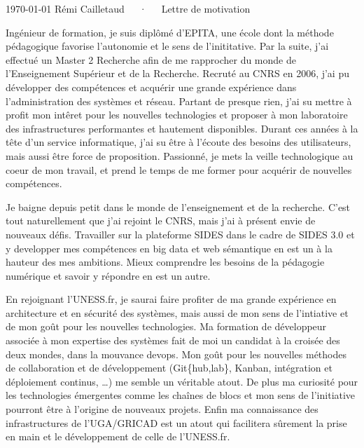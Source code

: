 \documentclass[11pt, a4paper]{awesome-cv}
\begin{document}
\makecvheader[R]

\makecvfooter
  {\today}
  {Rémi Cailletaud~~~·~~~Lettre de motivation}
  {}

\makelettertitle

\begin{cvletter}

	Ingénieur de formation, je suis diplômé d'EPITA, une école dont la méthode pédagogique favorise l'autonomie et le sens de l'inititative. Par la suite, j'ai effectué un Master 2 Recherche afin de me rapprocher du monde de l'Enseignement Supérieur et de la Recherche. Recruté au CNRS en 2006, j'ai pu développer des compétences et acquérir une grande expérience dans l'administration des systèmes et réseau. Partant de presque rien, j'ai su mettre à profit mon intêret pour les nouvelles technologies et proposer à mon laboratoire des infrastructures performantes et hautement disponibles. Durant ces années à la tête d'un service informatique, j'ai su être à l'écoute des besoins des utilisateurs, mais aussi être force de proposition. Passionné, je mets la veille technologique au coeur de mon travail, et prend le temps de me former pour acquérir de nouvelles compétences. 


	Je baigne depuis petit dans le monde de l'enseignement et de la recherche. C'est tout naturellement que j'ai rejoint le CNRS, mais j'ai à présent envie de nouveaux défis. Travailler sur la plateforme SIDES dans le cadre de SIDES 3.0 et y developper mes compétences en big data et web sémantique en est un à la hauteur des mes ambitions. Mieux comprendre les besoins de la pédagogie numérique et savoir y répondre en est un autre.	

	En rejoignant l'UNESS.fr, je saurai faire profiter de ma grande expérience en architecture et en sécurité des systèmes, mais aussi de mon sens de l'intiative et de mon goût pour les nouvelles technologies. Ma formation de développeur associée à mon expertise des systèmes fait de moi un candidat à la croisée des deux mondes, dans la mouvance devops. Mon goût pour les nouvelles méthodes de collaboration et de développement (Git\{hub,lab\}, Kanban, intégration et déploiement continus, \ldots) me semble un véritable atout. De plus ma curiosité pour les technologies émergentes comme les chaînes de blocs et mon sens de l'initiative pourront être à l'origine de nouveaux projets.
	Enfin ma connaissance des infrastructures de l'UGA/GRICAD est un atout qui facilitera sûrement la prise en main et le développement de celle de l'UNESS.fr.
\end{cvletter}


\makeletterclosing
\end{document}
